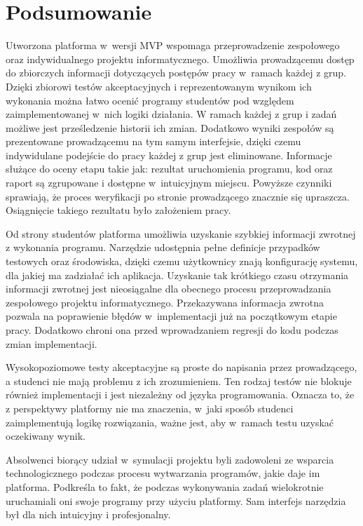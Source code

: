 \section{Podsumowanie}
\label{research_summary}

Utworzona platforma w~wersji MVP wspomaga przeprowadzenie zespołowego oraz indywidualnego projektu informatycznego.
Umożliwia prowadzącemu dostęp do zbiorczych informacji dotyczących postępów pracy w~ramach każdej z grup.
Dzięki zbiorowi testów akceptacyjnych i reprezentowanym wynikom ich wykonania można łatwo ocenić programy studentów pod względem zaimplementowanej w~nich logiki działania.
W ramach każdej z grup i zadań możliwe jest prześledzenie historii ich zmian.
Dodatkowo wyniki zespołów są prezentowane prowadzącemu na tym samym interfejsie, dzięki czemu indywidulane podejście do pracy każdej z grup jest eliminowane.
Informacje służące do oceny etapu takie jak: rezultat uruchomienia programu, kod oraz raport są zgrupowane i dostępne w~intuicyjnym miejscu.
Powyższe czynniki sprawiają, że proces weryfikacji po stronie prowadzącego znacznie się upraszcza.
Osiągnięcie takiego rezultatu było założeniem pracy.

Od strony studentów platforma umożliwia uzyskanie szybkiej informacji zwrotnej z wykonania programu.
Narzędzie udostępnia pełne definicje przypadków testowych oraz środowiska, dzięki czemu użytkownicy znają konfigurację systemu, dla jakiej ma zadziałać ich aplikacja.
Uzyskanie tak krótkiego czasu otrzymania informacji zwrotnej jest nieosiągalne dla obecnego procesu przeprowadzania zespołowego projektu informatycznego.
Przekazywana informacja zwrotna pozwala na poprawienie błędów w~implementacji już na początkowym etapie pracy.
Dodatkowo chroni ona przed wprowadzaniem regresji do kodu podczas zmian implementacji.

Wysokopoziomowe testy akceptacyjne są proste do napisania przez prowadzącego, a studenci nie mają problemu z ich zrozumieniem.
Ten rodzaj testów nie blokuje również implementacji i jest niezależny od języka programowania.
Oznacza to, że z perspektywy platformy nie ma znaczenia, w~jaki sposób studenci zaimplementują logikę rozwiązania, ważne jest, aby w~ramach testu uzyskać oczekiwany wynik.

Absolwenci biorący udział w~symulacji projektu byli zadowoleni ze wsparcia technologicznego podczas procesu wytwarzania programów, jakie daje im platforma.
Podkreśla to fakt, że podczas wykonywania zadań wielokrotnie uruchamiali oni swoje programy przy użyciu platformy.
Sam interfejs narzędzia był dla nich intuicyjny i profesjonalny.

